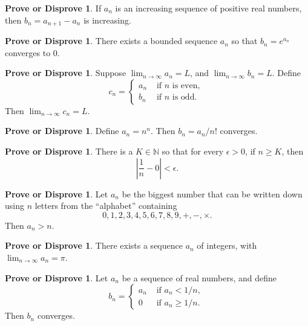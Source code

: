 \documentclass[12pt]{article}
\theoremstyle{definition}
\newtheorem{podsip}[theorem]{Prove or Disprove}
\newcommand{\N}{\mathbb{N}}
\newcommand{\limn}{\displaystyle\lim_{n \to \infty}}
\begin{document}
\begin{podsip} %
If $a_n$ is an increasing sequence of positive real numbers, then $b_n = a_{n+1} - a_{n}$ is increasing.
\end{podsip}

\begin{podsip} %
There exists a bounded sequence $a_n$ so that $b_n = e^{a_n}$ converges to $0$.
\end{podsip}

\begin{podsip} %
Suppose $\limn a_n = L$, and $\limn b_n = L$.  Define
$$
c_n = \begin{cases}
a_{n} & \mbox{ if $n$ is even, } \\
b_{n} & \mbox{ if $n$ is odd. }
\end{cases}
$$
Then $\limn c_n = L$.
\end{podsip}

\begin{podsip} %
Define $a_n = n^n$.  Then $b_n = a_n / n!$ converges.
\end{podsip}

\begin{podsip} %
There is a $K \in \N$ so that for every $\epsilon > 0$, if $n \geq K$, then 
$$
\left| \frac{1}{n} - 0 \right| < \epsilon.
$$
\end{podsip}

\begin{podsip} %
  Let $a_n$ be the biggest number that can be written down using $n$
  letters from the ``alphabet'' containing
$$
0, 1, 2, 3, 4, 5, 6, 7, 8,
  9, +, -, \times.
$$
Then $a_n > n$.
\end{podsip}

\begin{podsip} %
There exists a sequence $a_n$ of integers, with $\limn a_n = \pi$.
\end{podsip}

\begin{podsip} %
Let $a_n$ be a sequence of real numbers, and define
$$
b_n = \begin{cases}
a_{n} & \mbox{ if $a_n < 1/n$, } \\
0 & \mbox{ if $a_n \geq 1/n$. }
\end{cases}
$$
Then $b_n$ converges.
\end{podsip}
\end{document}
